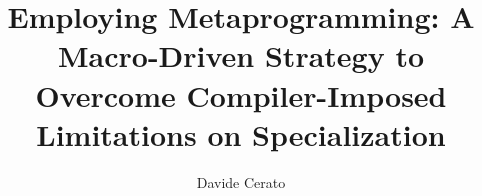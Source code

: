 \documentclass{adapt-lab}
\begin{document}
\title{Employing Metaprogramming: A Macro-Driven Strategy to Overcome Compiler-Imposed Limitations on Specialization}
\author{Davide Cerato}
\school{}

\makefirstpage

\frontmatter

\tableofcontents

\mainmatter













\appendix



\end{document}
